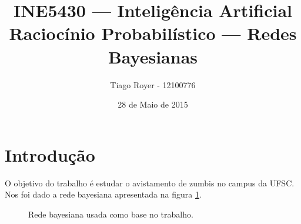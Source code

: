 \documentclass{article}
\begin{document}
\title{
    INE5430 --- Inteligência Artificial \\
    Raciocínio Probabilístico --- Redes Bayesianas
}
\author{
    Tiago Royer - 12100776
}
\date{28 de Maio de 2015}
\maketitle

\section{Introdução}

O objetivo do trabalho é estudar o avistamento de zumbis no campus da UFSC.
Nos foi dado a rede bayesiana apresentada na figura \ref{rede_bayesiana}.

\begin{figure}[h]
    \centering
    \caption{
        Rede bayesiana usada como base no trabalho.
    }
    \label{rede_bayesiana}
\end{figure}
\end{document}

